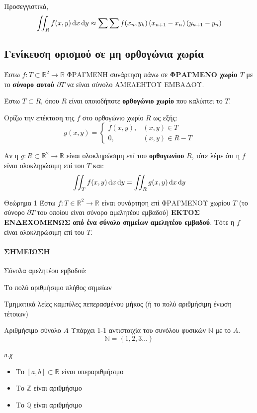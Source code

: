 \documentclass[11pt,a4paper,titlepage,draft]{article}
\begin{document}
Προσεγγιστικά,
\[ \iint_R f(x,y) \dif x \dif y \approx \sum \sum f(x_n, y_k) \left( x_{n+1}-x_n \right) \left( y_{n+1}-y_n \right) \]


\subsection{Γενίκευση ορισμού σε μη ορθογώνια χωρία}
Έστω \(f: T \subset \mathbb R^2 \to \mathbb R\) ΦΡΑΓΜΕΝΗ συνάρτηση πάνω σε \textbf{ΦΡΑΓΜΕΝΟ χωρίο \(T\)} με το \textbf{σύνορο αυτού \(\partial T\)} να είναι σύνολο ΑΜΕΛΕΗΤΟΥ ΕΜΒΑΔΟΥ.

Έστω \(T \subset R\), όπου \(R\) είναι οποιοδήποτε \textbf{ορθογώνιο χωρίο} που καλύπτει το \(T\).

Ορίζω την επέκταση της \(f\) στο ορθογώνιο χωρίο \(R\) ως εξής:
\[
g(x,y) = 
\begin{cases}
f(x,y),&(x,y) \in T \\
0,& (x,y) \in R-T
\end{cases}
\]

Αν η \(g: R \subset \mathbb R^2 \to \mathbb R\) είναι ολοκληρώσιμη επί του \textbf{ορθογωνίου} \(R\), τότε λέμε ότι η \(f\) είναι ολοκληρώσιμη επί του \(T\) και:
\[
\iint_T f(x,y) \dif x \dif y =
\iint_R g(x,y) \dif x \dif y
\]

\begin{attnbox}{Θεώρημα 1}
Έστω \(f:T \in  \mathbb R ^2 \to  \mathbb R \) είναι  συνάρτηση επί ΦΡΑΓΜΕΝΟΥ χωρίου \(T\) (το σύνορο \(\partial T\) του οποίου είναι σύνορο αμελητέου εμβαδού) \textbf{ΕΚΤΟΣ ΕΝΔΕΧΟΜΕΝΩΣ από ένα σύνολο σημείων αμελητέου εμβαδού}. Τότε η \(f\) είναι ολοκληρώσιμη επί του \(T\).

\paragraph{ΣΗΜΕΙΩΣΗ} Σύνολα αμελητέου εμβαδού:
\begin{enumparen}
\item Το πολύ αριθμήσιμο πλήθος σημείων
\item Τμηματικά λείες καμπύλες πεπερασμένου μήκος (ή το πολύ αριθμήσιμη ένωση τέτοιων)
\end{enumparen}


\end{attnbox}

\begin{infobox}{Αριθμήσιμο σύνολο \(A\)}
Υπάρχει 1-1 αντιστοιχία του συνόλου φυσικών \(\mathbb N\) με το \(A\).
\[
\mathbb N =  \left\lbrace 1,2,3\dots \right\rbrace
\]

\textit{π.χ}
\begin{itemize}
\item Το \([a,b] \subset \mathbb R\) είναι υπεραριθμήσιμο
\item Το \(\mathbb Z\) είναι αριθμήσιμο
\item Το \(\mathbb Q\) είναι αριθμήσιμο
\end{itemize}
\end{infobox}
\end{document}
